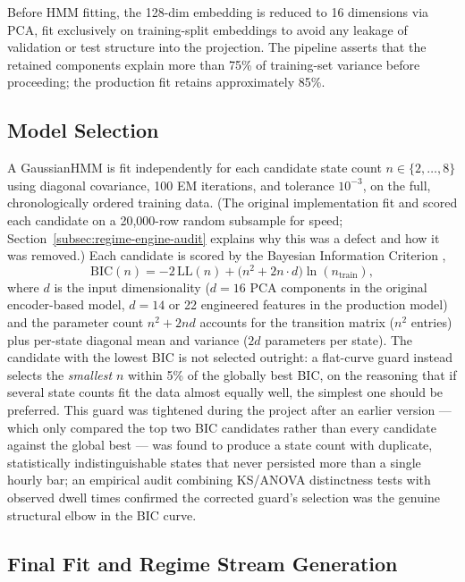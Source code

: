 Before HMM fitting, the 128-dim embedding is reduced to 16 dimensions via PCA, fit exclusively on training-split embeddings to avoid any leakage of validation or test structure into the projection. The pipeline asserts that the retained components explain more than 75\% of training-set variance before proceeding; the production fit retains approximately 85\%.

\subsection{Model Selection}
\label{subsec:regime-model-selection}

A GaussianHMM is fit independently for each candidate state count $n \in \{2, \ldots, 8\}$ using diagonal covariance, 100 EM iterations, and tolerance $10^{-3}$, on the full, chronologically ordered training data. (The original implementation fit and scored each candidate on a 20{,}000-row random subsample for speed; Section~\ref{subsec:regime-engine-audit} explains why this was a defect and how it was removed.) Each candidate is scored by the Bayesian Information Criterion \cite{schwarz1978},
\[
\mathrm{BIC}(n) = -2\,\mathrm{LL}(n) + \big(n^2 + 2n\cdot d\big)\ln(n_{\mathrm{train}}),
\]
where $d$ is the input dimensionality ($d=16$ PCA components in the original encoder-based model, $d=14$ or 22 engineered features in the production model) and the parameter count $n^2 + 2nd$ accounts for the transition matrix ($n^2$ entries) plus per-state diagonal mean and variance ($2d$ parameters per state). The candidate with the lowest BIC is not selected outright: a flat-curve guard instead selects the \emph{smallest} $n$ within 5\% of the globally best BIC, on the reasoning that if several state counts fit the data almost equally well, the simplest one should be preferred. This guard was tightened during the project after an earlier version --- which only compared the top two BIC candidates rather than every candidate against the global best --- was found to produce a state count with duplicate, statistically indistinguishable states that never persisted more than a single hourly bar; an empirical audit combining KS/ANOVA distinctness tests with observed dwell times confirmed the corrected guard's selection was the genuine structural elbow in the BIC curve.

\subsection{Final Fit and Regime Stream Generation}
\label{subsec:regime-final-fit}

